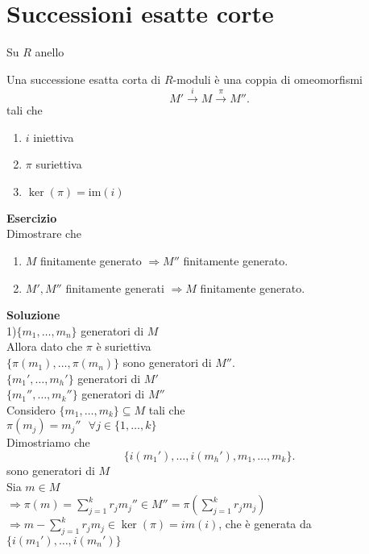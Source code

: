 \documentclass[12px]{article}
\begin{document}
\section{Successioni esatte corte}
Su $R$ anello
	\begin{defi}
		Una successione esatta corta di $R$-moduli è una coppia di omeomorfismi 
		\[
			M' \xrightarrow{i} M \xrightarrow{\pi} M''
		.\] 
	tali che
	\begin{enumerate}
		\item $i$ iniettiva
		\item $\pi$ suriettiva
		\item $\ker(\pi) = \text{im}(i)$
	\end{enumerate}
	\end{defi}
	\textbf{Esercizio}\\
	Dimostrare che 
	\begin{enumerate}
		\item $M$ finitamente generato $ \Rightarrow M''$ finitamente generato.
		\item $M', M''$ finitamente generati  $ \Rightarrow  M$ finitamente generato.
	\end{enumerate}
	\textbf{Soluzione}\\
	1)$\{m_1,\ldots, m_n\}$ generatori di $M$\\
	Allora dato che  $\pi$ è suriettiva\\
	$\{\pi(m_1),\ldots,\pi(m_n)\}$ sono generatori di $M''$.\\
	$\{m_1',\ldots, m_h'\}$ generatori di $M'$\\
	$\{m_1'',\ldots,m_k''\}$ generatori di $M''$\\
	Considero $\{m_1,\ldots, m_k\}\subseteq M$ tali che\\
	$\pi(m_j) = m_j''\ \ \ \forall j\in \{1,\ldots,k\} $\\
	Dimostriamo che
	 \[
	 \{i(m_1'),\ldots,i(m_h'), m_1,\ldots,m_k\}
	.\] 
	sono generatori di $M$\\
	Sia  $m\in M$\\
	 $\displaystyle \Rightarrow  \pi(m) = \sum^{k}_{j=1}r_jm_j''\in M'' = \pi( \sum^{k}_{j=1}r_jm_j)$\\
	 $ \displaystyle\Rightarrow m - \sum^{k}_{j = 1}r_j m_j\in \ker (\pi) = im(i)$, che è generata da $\{ i(m_1'),\ldots,i(m_n')\}$\\

	
\end{document}
